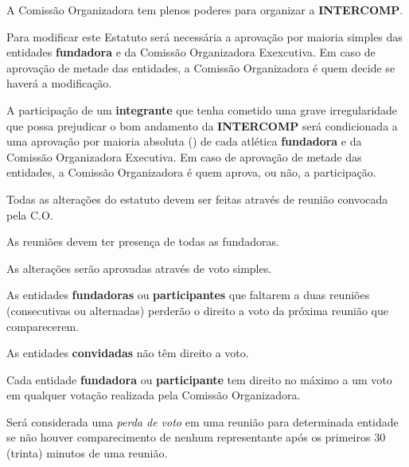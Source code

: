 \begin{article}
	A Comissão Organizadora tem plenos poderes para organizar a \textbf{INTERCOMP}.

	\begin{xparagraph}
		Para modificar este Estatuto será necessária a aprovação por maioria simples das entidades \textbf{fundadora} e da Comissão Organizadora Exexcutiva. Em caso de aprovação de metade das entidades, a Comissão Organizadora é quem decide se haverá a modificação.
	\end{xparagraph}

	\begin{xparagraph}
		A participação de um \textbf{integrante} que tenha cometido uma grave irregularidade que possa prejudicar o bom andamento da \textbf{INTERCOMP} será condicionada a uma aprovação por maioria absoluta () de cada atlética \textbf{fundadora} e da Comissão Organizadora Executiva. Em caso de aprovação de metade das entidades, a Comissão Organizadora é quem aprova, ou não, a participação.
	\end{xparagraph}
\end{article}

\begin{article}
	Todas as alterações do estatuto devem ser feitas através de reunião convocada pela C.O.

	\begin{xparagraph}
		As reuniões devem ter presença de todas as fundadoras.
	\end{xparagraph}

	\begin{xparagraph}
		As alterações serão aprovadas através de voto simples.
	\end{xparagraph}
\end{article}

\begin{article}
	As entidades \textbf{fundadoras} ou \textbf{participantes} que faltarem a duas reuniões (consecutivas ou alternadas) perderão o direito a voto da próxima reunião que comparecerem.

	\begin{xparagraph}
		As entidades \textbf{convidadas} não têm direito a voto.
	\end{xparagraph}

	\begin{xparagraph}
		Cada entidade \textbf{fundadora} ou \textbf{participante} tem direito no máximo a um voto em qualquer votação realizada pela Comissão Organizadora.
	\end{xparagraph}

	\begin{xparagraph}
		Será considerada uma \textit{perda de voto} em uma reunião para determinada entidade se não houver comparecimento de nenhum representante após os primeiros 30 (trinta) minutos de uma reunião.
	\end{xparagraph}
\end{article}


